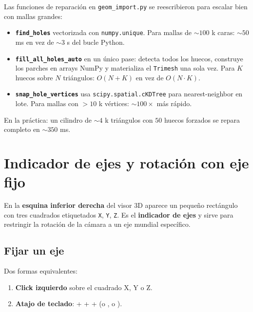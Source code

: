 \documentclass[11pt, a4paper]{article}
\newcommand{\tecla}[1]{\texttt{\small\fbox{#1}}}
\begin{document}
Las funciones de reparación en \texttt{geom\_import.py} se reescribieron
para escalar bien con mallas grandes:

\begin{itemize}[itemsep=2pt]
  \item \textbf{\texttt{find\_holes}} vectorizada con \texttt{numpy.unique}.
        Para mallas de $\sim 100$ k caras: $\sim 50$ ms en vez de
        $\sim 3$ s del bucle Python.
  \item \textbf{\texttt{fill\_all\_holes\_auto}} en un único pase: detecta
        todos los huecos, construye los parches en arrays NumPy y
        materializa el \texttt{Trimesh} una sola vez. Para $K$ huecos
        sobre $N$ triángulos: $O(N + K)$ en vez de $O(N \cdot K)$.
  \item \textbf{\texttt{snap\_hole\_vertices}} usa
        \texttt{scipy.spatial.cKDTree} para nearest-neighbor en lote.
        Para mallas con $> 10$ k vértices: $\sim 100\times$ más rápido.
\end{itemize}

En la práctica: un cilindro de $\sim 4$ k triángulos con $50$ huecos
forzados se repara completo en $\sim 350$ ms.

\section{Indicador de ejes y rotación con eje fijo}

En la \textbf{esquina inferior derecha} del visor 3D aparece un pequeño
rectángulo con tres cuadrados etiquetados \texttt{X}, \texttt{Y},
\texttt{Z}. Es el \textbf{indicador de ejes} y sirve para restringir la
rotación de la cámara a un eje mundial específico.

\subsection{Fijar un eje}

Dos formas equivalentes:

\begin{enumerate}[itemsep=2pt]
  \item \textbf{Click izquierdo} sobre el cuadrado X, Y o Z.
  \item \textbf{Atajo de teclado}: \tecla{Ctrl} + \tecla{Shift} +
        \tecla{Alt} + \tecla{X} (o \tecla{Y}, o \tecla{Z}).
\end{enumerate}
\end{document}
